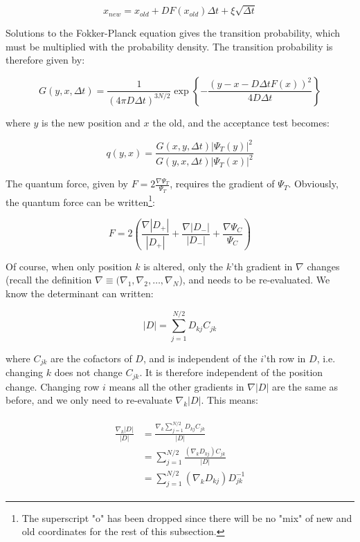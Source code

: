 \documentclass[english, a4paper]{article}
\begin{document}
	\begin{equation}
	x_{new} = x_{old} + DF(x_{old})\Delta t + \xi\sqrt{\Delta t}
	\end{equation}
	
	Solutions to the Fokker-Planck equation gives the transition probability, which must be multiplied with the probability density. The transition probability is therefore given by:
	
	\begin{equation}
	G(y,x,\Delta t) = \frac{1}{(4\pi D\Delta t)^{3N/2}}\exp\left\{ -\frac{(y-x-D\Delta tF(x))^2}{4D\Delta t} \right\}
	\end{equation}
	
	where $y$ is the new position and $x$ the old, and the acceptance test becomes:
	
	\begin{equation}
	q(y,x) = \frac{G(x,y,\Delta t)|\Psi_T(y)|^2}{G(y,x,\Delta t)|\Psi_T(x)|^2}
	\end{equation}
	
	The quantum force, given by $F = 2\frac{\nabla \Psi_T}{\Psi_T}$, requires the gradient of $\Psi_T$. Obviously, the quantum force can be written\footnote{The superscript "o" has been dropped since there will be no "mix" of new and old coordinates for the rest of this subsection.}:
	
	\begin{equation}
	F = 2\left(\frac{\nabla |D_+|}{|D_+|} + \frac{\nabla |D_-|}{|D_-|} + \frac{\nabla \Psi_C}{\Psi_C}\right)
	\end{equation}
	
	Of course, when only position $k$ is altered, only the $k$'th gradient in $\nabla$ changes (recall the definition $\nabla \equiv (\nabla_1, \nabla_2, \ldots, \nabla_N$), and needs to be re-evaluated. We know the determinant can written:
	
	\begin{equation}
	|D| = \sum_{j=1}^{N/2}D_{kj}C_{jk}
	\end{equation}
	
	where $C_{jk}$ are the cofactors of $D$, and is independent of the $i$'th row in $D$, i.e. changing $k$ does not change $C_{jk}$. It is therefore independent of the position change. Changing row $i$ means all the other gradients in $\nabla|D|$ are the same as before, and we only need to re-evaluate $\nabla_k|D|$. This means:
	
	\begin{align}
	\begin{split}
	\frac{\nabla_k|D|}{|D|} &= \frac{\nabla_k\sum_{j=1}^{N/2}D_{kj}C_{jk}}{|D|}\\
	&= \sum_{j=1}^{N/2}\frac{(\nabla_kD_{kj})C_{jk}}{|D|}\\
	&= \sum_{j=1}^{N/2}(\nabla_kD_{kj})D_{jk}^{-1}
	\end{split}
	\end{align}
	
\end{document}
